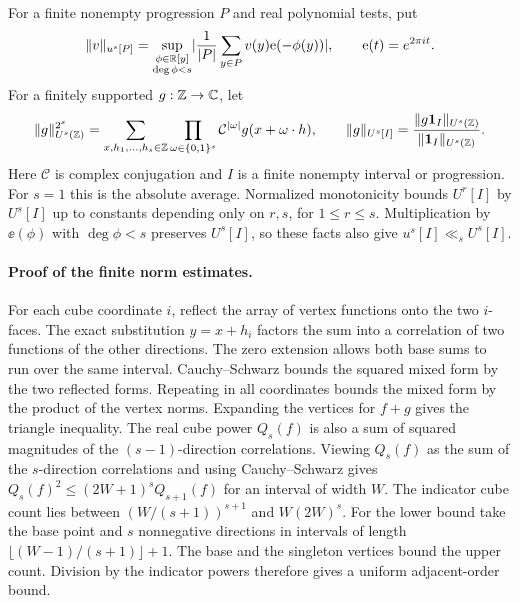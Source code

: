 \begin{definition}\label{phase-tests}
For a finite nonempty progression $P$ and real polynomial tests, put
\[
 \lVert v\rVert_{u^s[P]}
  =\sup_{\substack{\phi\in\mathbb R[y]\\\deg\phi<s}}
    \lvert\frac1{|P|}\sum_{y\in P}v(y)\mathrm e(-\phi(y))\rvert,
 \qquad \mathrm e(t)=e^{2\pi it}.
\]
For a finitely supported $g:\mathbb Z\to\mathbb C$, let
\[
 \lVert g\rVert^{2^s}_{U^s(\mathbb Z)}
  =\sum_{x,h_1,\ldots,h_s\in\mathbb Z}
     \prod_{\omega\in\{0,1\}^s}
       \mathcal C^{|\omega|}g(x+\omega\cdot h),
 \qquad
 \lVert g\rVert_{U^s[I]}
 =\frac{\lVert g\mathbf 1_I\rVert_{U^s(\mathbb Z)}}{\lVert\mathbf 1_I\rVert_{U^s(\mathbb Z)}}.
\]
Here $\mathcal C$ is complex conjugation and $I$ is a finite
nonempty interval or progression. For $s=1$ this is the absolute
average. Normalized monotonicity bounds $U^r[I]$ by $U^s[I]$
up to constants depending only on $r,s$, for $1\le r\le s$.
Multiplication by $\ee(\phi)$ with $\deg\phi<s$ preserves $U^s[I]$,
so these facts also give $u^s[I]\ll_s U^s[I]$.
\end{definition}

\paragraph{Proof of the finite norm estimates.}
For each cube coordinate $i$, reflect the array of vertex functions
onto the two $i$-faces. The exact substitution $y=x+h_i$ factors the
sum into a correlation of two functions of the other directions. The
zero extension allows both base sums to run over the same interval.
Cauchy--Schwarz bounds the squared mixed form by the two reflected
forms. Repeating in all coordinates bounds the mixed form by the
product of the vertex norms. Expanding the vertices for $f+g$
gives the triangle inequality. The real cube power $Q_s(f)$ is also
a sum of squared magnitudes of the $(s-1)$-direction correlations.
Viewing $Q_s(f)$ as the sum of the $s$-direction correlations and
using Cauchy--Schwarz gives $Q_s(f)^2\le(2W+1)^sQ_{s+1}(f)$ for
an interval of width $W$. The indicator cube count lies between
$(W/(s+1))^{s+1}$ and $W(2W)^s$. For the lower bound take the base
point and $s$ nonnegative directions in intervals of length
$\lfloor(W-1)/(s+1)\rfloor+1$. The base and the singleton vertices
bound the upper count. Division by the indicator powers therefore
gives a uniform adjacent-order bound.

